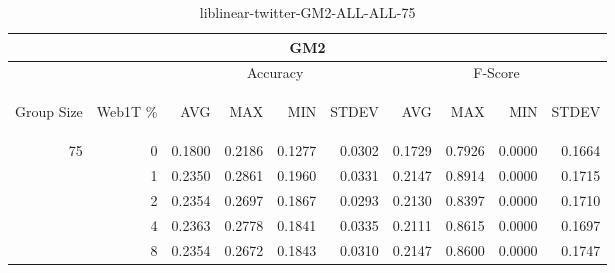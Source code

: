 \begin{center}
\begin{table}[htbp]
\begin{tabular}{ | r | r | r | r | r | r | r | r | r | r |}
\hline
\multicolumn{10}{|c|}{GM2}\\
\hline
 & & \multicolumn{4}{|c|}{Accuracy} & \multicolumn{4}{|c|}{F-Score}\\ \cline{3-10}
\begin{sideways}Group Size\end{sideways} & \begin{sideways}Web1T \%\end{sideways} & \begin{sideways}AVG\end{sideways} & \begin{sideways}MAX\end{sideways} & \begin{sideways}MIN\end{sideways} & \begin{sideways}STDEV\end{sideways} & \begin{sideways}AVG\end{sideways} & \begin{sideways}MAX\end{sideways} & \begin{sideways}MIN\end{sideways} & \begin{sideways}STDEV\end{sideways}\\
\hline
\multirow{5}{*}{75}
 & 0 & 0.1800 & 0.2186 & 0.1277 & 0.0302 & 0.1729 & 0.7926 & 0.0000 & 0.1664\\ \cline{2-10}
 & 1 & 0.2350 & 0.2861 & 0.1960 & 0.0331 & 0.2147 & 0.8914 & 0.0000 & 0.1715\\ \cline{2-10}
 & 2 & 0.2354 & 0.2697 & 0.1867 & 0.0293 & 0.2130 & 0.8397 & 0.0000 & 0.1710\\ \cline{2-10}
 & 4 & 0.2363 & 0.2778 & 0.1841 & 0.0335 & 0.2111 & 0.8615 & 0.0000 & 0.1697\\ \cline{2-10}
 & 8 & 0.2354 & 0.2672 & 0.1843 & 0.0310 & 0.2147 & 0.8600 & 0.0000 & 0.1747\\ \cline{2-10}
\hline
\end{tabular}
\caption{liblinear-twitter-GM2-ALL-ALL-75}
\end{table}
\end{center}

